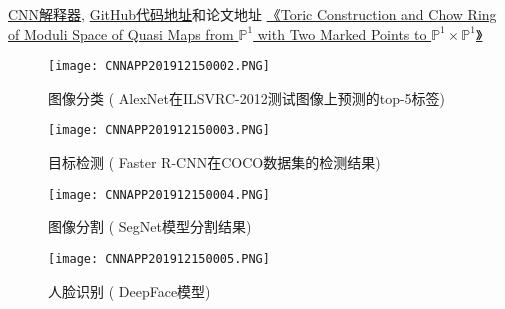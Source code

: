 \href{https://poloclub.github.io/cnn-explainer/}{CNN解释器}, \href{https://github.com/poloclub/cnn-explainer}{GitHub代码地址}和论文地址
\href{https://arxiv.org/abs/2004.1500}{《Toric Construction and Chow Ring of Moduli Space of Quasi Maps from $\mathbb P^1$ with Two Marked Points to $\mathbb P^1\times \mathbb P^1$》}
\begin{figure}[H]
    \centering
    \texttt{[image: CNNAPP201912150002.PNG]}
    \caption{图像分类 ( AlexNet在ILSVRC-2012测试图像上预测的top-5标签)}
    \label{CNNAPP201912150002}
    \vspace{-0.4cm}
\end{figure}
\begin{figure}[H]
    \centering
    \texttt{[image: CNNAPP201912150003.PNG]}
    \caption{目标检测 ( Faster R-CNN在COCO数据集的检测结果)}
    \label{CNNAPP201912150003}
    \vspace{-0.4cm}
\end{figure}
\begin{figure}[H]
    \centering
    \texttt{[image: CNNAPP201912150004.PNG]}
    \caption{图像分割 ( SegNet模型分割结果)}
    \label{CNNAPP201912150004}
    \vspace{-0.4cm}
\end{figure}
\begin{figure}[H]
    \centering
    \texttt{[image: CNNAPP201912150005.PNG]}
    \caption{人脸识别 ( DeepFace模型)}
    \label{CNNAPP201912150005}
    \vspace{-0.4cm}
\end{figure}
